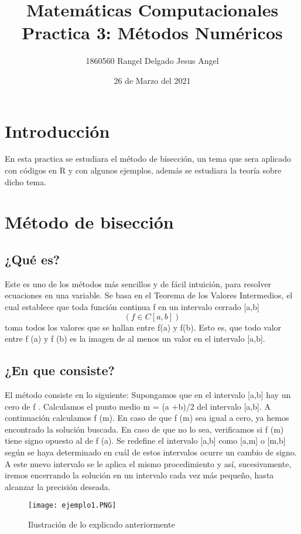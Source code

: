\documentclass{article}
\title{Matemáticas Computacionales \\ Practica 3: Métodos Numéricos}
\author{1860560 Rangel Delgado Jesus Angel}
\date{26 de Marzo del 2021}
\begin{document}
\maketitle

\section{Introducción}
En esta practica se estudiara el método de bisección, un tema que sera aplicado con códigos en R y con algunos ejemplos, además se estudiara la teoría sobre dicho tema.

\section{Método de bisección}
\subsection{¿Qué es?}
Este es uno de los métodos más sencillos y de fácil
intuición, para resolver ecuaciones en una variable. Se
basa en el Teorema de los Valores Intermedios, el cual
establece que toda función continua f en un intervalo
cerrado [a,b] 
\begin{equation}
    ( f \in C[a,b] )
\end{equation}
toma todos los valores que
se hallan entre f(a) y f(b). Esto es, que todo valor entre
f (a) y f (b) es la imagen de al menos un valor en el
intervalo [a,b].

\subsection{¿En que consiste?}
El método consiste en lo siguiente: Supongamos que en el intervalo [a,b] hay un cero de f . Calculamos el punto
medio m = (a +b)/2 del intervalo [a,b]. A continuación calculamos f (m). En caso de que f (m) sea igual a cero,
ya hemos encontrado la solución buscada. En caso de que no lo sea, verificamos si f (m) tiene signo opuesto al
de f (a). Se redefine el intervalo [a,b] como [a,m] o [m,b] según se haya determinado en cuál de estos intervalos
ocurre un cambio de signo. A este nuevo intervalo se le aplica el mismo procedimiento y así, sucesivamente, iremos
encerrando la solución en un intervalo cada vez más pequeño, hasta alcanzar la precisión deseada.

\newpage
\begin{figure}[h]
    \centering
    \texttt{[image: ejemplo1.PNG]}
    \caption{Ilustración de lo explicado anteriormente}
    \label{fig:mesh1}
\end{figure}
\end{document}
